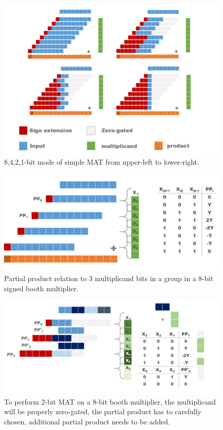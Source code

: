 \begin{figure}[h]
    \centering
    \includegraphics[width=0.8\linewidth]{inc/4_proposed_architecture/figure/simple_MAT.png}
    \caption{8,4,2,1-bit mode of simple MAT from upper-left to lower-right.}
    \label{fig:simple_MAT}
\end{figure}
\begin{figure}[t]
    \centering
    \includegraphics[width=0.8\linewidth]{inc/4_proposed_architecture/figure/booth_8.png}
    \caption{Partial product relation to 3 multiplicand bits in a group in a 8-bit signed booth multiplier.}
    \label{fig:booth_8}
\end{figure}
\begin{figure}[t]
    \centering
    \includegraphics[width=0.8\linewidth]{inc/4_proposed_architecture/figure/booth_2b_on_8b.png}
    \caption{To perform 2-bit MAT on a 8-bit booth multiplier, the multiplicand will be properly zero-gated, the partial product has to carefully chosen, additional partial product needs to be added. }
    \label{fig:booth_2b_on_8b}
\end{figure}
